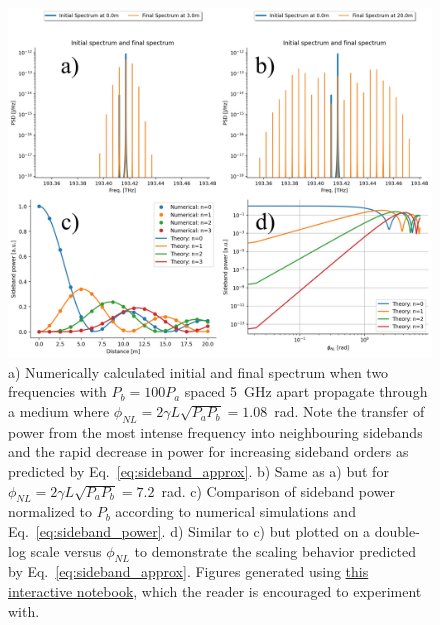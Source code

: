 \begin{figure}
    \centering
    \includegraphics[width=1.0\linewidth]{figures/FWM_combined.png}
    \caption{a) Numerically calculated initial and final spectrum when two frequencies with $P_b=100P_a$ spaced 5~GHz apart  propagate through a medium where $\phi_{NL}=2\gamma L\sqrt{P_aP_b}=1.08$~rad. Note the transfer of power from the most intense frequency into neighbouring sidebands and the rapid decrease in power for increasing sideband orders as predicted by Eq.~\ref{eq:sideband_approx}. b) Same as a) but for $\phi_{NL}=2\gamma L\sqrt{P_aP_b}=7.2$~rad. c) Comparison of sideband power normalized to $P_b$ according to numerical simulations and Eq.~\ref{eq:sideband_power}. d) Similar to c) but plotted on a double-log scale versus $\phi_{NL}$ to demonstrate the scaling behavior predicted by Eq.~\ref{eq:sideband_approx}. Figures generated using \href{https://colab.research.google.com/drive/1l054EDg-50aK5GORN_md4_-tlFy4jwC5?usp=sharing}{this interactive notebook}, which the reader is encouraged to experiment with.   }
    \label{fig:FWM}
\end{figure} 

